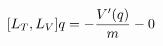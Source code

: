 \documentclass[preview]{standalone}
\begin{document}
\begin{align*}
\special{dvisvgm:raw <g id='unique000'>}[L_T, L_V]q = -\frac{V'(q)}{m} - 0\special{dvisvgm:raw </g>}
\end{align*}
\end{document}
